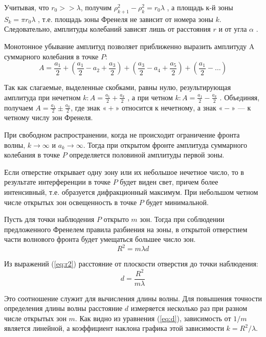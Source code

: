 \documentclass[12pt]{article}
\let\oldref\ref
\renewcommand{\ref}[1]{(\oldref{#1})}
\begin{document}
    Учитывая, что $ r_0 >> \lambda $, получим $ \rho^2_{k+1} - \rho^2_{k} = r_0 \lambda $ , а площадь $ к $-й зоны $ S_k = \pi r_0 \lambda $ , т.е. площадь зоны Френеля не зависит от номера зоны $ k $. Следовательно, амплитуды колебаний зависят лишь от расстояния $ r $ и от угла $ \alpha $ .  

    Монотонное убывание амплитуд позволяет приближенно выразить амплитуду A суммарного колебания в точке $ P $:
    \begin{equation}
        \label{eq:a2}
        A = \frac{a_1}{2} + \left(\frac{a_1}{2} - a_2 + \frac{a_3}{2} \right) + \left(\frac{a_3}{2} - a_4 + \frac{a_5}{2} \right) + \left(\frac{a_1}{2} - \dots \right)
    \end{equation}

    Так как слагаемые, выделенные скобками, равны нулю, результирующая амплитуда при нечетном $ k : A = \frac{a_1}{2} + \frac{a_k}{2}$  , а при четном $ k : A = \frac{a_1}{2} - \frac{a_k}{2}$  . Объединяя, получаем $ A = \frac{a_1}{2} \pm \frac{a_k}{2} $, где знак $ «+» $ относится к нечетному, а знак $ «-» $ --- к четному числу зон Френеля.

    При свободном распространении, когда не происходит ограничение фронта волны, $ k \to \infty  $ и $ a_k \to \infty $. Тогда при открытом фронте амплитуда суммарного колебания в точке $ P $ определяется половиной амплитуды первой зоны.

    Если отверстие открывает одну зону или их небольшое нечетное число, то в результате интерференции в точке $ P $ будет виден свет, причем более интенсивный, т.е. образуется дифракционный максимум. При небольшом четном числе открытых зон освещенность в точке $ P $ будет минимальной.

    Пусть для точки наблюдения $ P $ открыто $ m $ зон. Тогда при соблюдении предложенного Френелем правила разбиения на зоны, в открытой отверстием части волнового фронта будет умещаться большее число зон. 
    \begin{equation}
        \label{eq:r2}
        R^2  = m \lambda d
    \end{equation}

    Из выражений \ref{eq:r2} расстояние от плоскости отверстия до точки наблюдения:
    \begin{equation}
        \label{eq:d}
        d = \frac{R^2}{m \lambda}
    \end{equation}

    Это соотношение служит для вычисления длины волны. Для повышения точности определения длины волны расстояние $ d $ измеряется несколько раз при разном числе открытых зон $ m $. Как видно из уравнения \ref{eq:d}, зависимость от $ 1/m $ является линейной, а коэффициент наклона графика этой зависимости $ k = R^2 / \lambda $.
\end{document}
